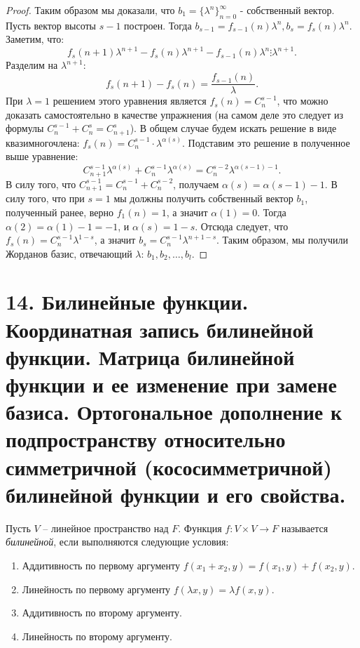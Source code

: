 \begin{proof}
    Таким образом мы доказали, что $b_1 = \{\lambda^n\}_{n=0}^{\infty}$ - собственный вектор.
    Пусть вектор высоты $s-1$ построен. Тогда $b_{s-1} = f_{s-1}(n) \lambda^n, b_s = f_s(n) \lambda^n$. Заметим, что: $$f_s(n+1) \lambda^{n+1} - f_s(n) \lambda^{n+1} - f_{s-1}(n) \lambda^{n} \vdots \lambda^{n + 1}.$$ Разделим на $\lambda^{n + 1}$: $$f_s(n+1) - f_s(n) = \frac{f_{s-1}(n)}{\lambda}.$$
    При $\lambda = 1$ решением этого уравнения является $f_s(n) = C_n^{s-1}$, что можно доказать 
    самостоятельно в качестве упражнения (на самом деле это следует из формулы $C_n^{s - 1} + C_n^s = C_{n + 1}^s$). В общем случае будем искать решение в виде квазимногочлена:
    $f_s(n) = C_n^{s-1} \cdot \lambda^{\alpha(s)}$. Подставим это решение в полученное выше уравнение:
    $$C_{n+1}^{s-1} \lambda^{\alpha(s)} + C_n^{s-1} \lambda^{\alpha(s)} 
    = C_n^{s-2} \lambda^{\alpha(s-1) - 1}.$$ В силу того, что $C_{n+1}^{s-1} = C_n^{s-1} + C_n^{s-2}$,
    получаем $\alpha(s) = \alpha(s-1) - 1$. В силу того, что при $s = 1$ мы должны получить собственный 
    вектор $b_1$, полученный ранее, верно $f_1(n) = 1$, а значит $\alpha(1) = 0$. 
    Тогда $\alpha(2) = \alpha(1) - 1 = -1$, и $\alpha(s) = 1 - s$. 
    Отсюда следует, что $f_s(n) = C_{n}^{s-1} \lambda^{1-s}$, а значит $b_s = C_{n}^{s-1} \lambda^{n+1-s}$.
    Таким образом, мы получили Жорданов базис, отвечающий $\lambda$: $b_1, b_2, \dots, b_l$.
\end{proof}

\section{14. Билинейные функции. Координатная запись билинейной функции. Матрица билинейной функции и ее изменение при замене базиса. Ортогональное дополнение к подпространству относительно симметричной (кососимметричной) билинейной функции и его свойства.}

\begin{definition}
    Пусть $V$ -- линейное пространство над $F$. Функция $f: V \times V \to F$ называется \textit{билинейной}, если выполняются следующие условия:
    \begin{enumerate}
        \item Аддитивность по первому аргументу $f(x_1 + x_2, y) = f(x_1, y) + f(x_2, y)$.
        \item Линейность по первому аргументу $f(\lambda x, y) = \lambda f(x, y)$.
        \item Аддитивность по второму аргументу.
        \item Линейность по второму аргументу.
    \end{enumerate}
\end{definition}

